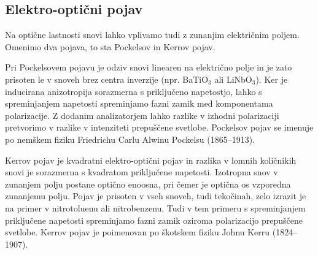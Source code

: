 \subsection*{Elektro-optični pojav}
Na optične lastnosti snovi lahko vplivamo tudi z zunanjim električnim poljem. Omenimo 
dva pojava, to sta Pockelsov in Kerrov pojav. 

Pri Pockelsovem
pojavu je odziv snovi linearen na električno polje in je zato prisoten le v snoveh
brez centra inverzije (npr. BaTiO$_3$ ali LiNbO$_3$). Ker je inducirana anizotropija sorazmerna
s priključeno napetostjo, lahko s spreminjanjem napetosti spreminjamo fazni zamik med 
komponentama polarizacije. Z dodanim analizatorjem lahko razlike v izhodni polarizaciji
pretvorimo v razlike v intenziteti prepuščene svetlobe. Pockelsov pojav se imenuje po
nemškem fiziku Friedrichu Carlu Alwinu Pockelsu (1865--1913).

Kerrov pojav je kvadratni elektro-optični pojav in razlika v lomnih količnikih snovi 
je sorazmerna s kvadratom priključene napetosti. Izotropna snov v zunanjem polju postane optično
enoosna, pri čemer je optična os vzporedna zunanjemu polju. Pojav je prisoten v vseh snoveh, tudi
tekočinah, zelo izrazit je na primer v nitrotoluenu ali nitrobenzenu. Tudi v tem 
primeru s spreminjanjem priključene napetosti spreminjamo fazni zamik oziroma polarizacijo
prepuščene svetlobe. Kerrov pojav je poimenovan po škotskem fiziku Johnu Kerru (1824--1907).
